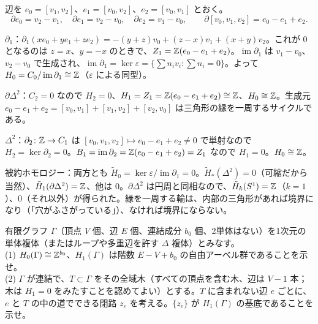 \begin{solution}
辺を $e_0=[v_1,v_2]$、$e_1=[v_0,v_2]$、$e_2=[v_0,v_1]$ とおく。
\[
\partial e_0=v_2-v_1,\quad\partial e_1=v_2-v_0,\quad\partial e_2=v_1-v_0,\qquad\partial[v_0,v_1,v_2]=e_0-e_1+e_2 .
\]

$\partial_1$：$\partial_1(xe_0+ye_1+ze_2)=-(y+z)v_0+(z-x)v_1+(x+y)v_2$。これが $0$ となるのは $z=x$、$y=-x$ のときで、$Z_1=\mathbb{Z}(e_0-e_1+e_2)$。$\operatorname{im}\partial_1$ は $v_1-v_0$、$v_2-v_0$ で生成され、$\operatorname{im}\partial_1=\ker\varepsilon=\{\sum n_iv_i:\sum n_i=0\}$。よって $H_0=C_0/\operatorname{im}\partial_1\cong\mathbb{Z}$（$\varepsilon$ による同型）。

$\partial\Delta^2$：$C_2=0$ なので $H_2=0$、$H_1=Z_1=\mathbb{Z}(e_0-e_1+e_2)\cong\mathbb{Z}$、$H_0\cong\mathbb{Z}$。生成元 $e_0-e_1+e_2=[v_0,v_1]+[v_1,v_2]+[v_2,v_0]$ は三角形の縁を一周するサイクルである。

$\Delta^2$：$\partial_2\colon\mathbb{Z}\to C_1$ は $[v_0,v_1,v_2]\mapsto e_0-e_1+e_2\ne0$ で単射なので $H_2=\ker\partial_2=0$。$B_1=\operatorname{im}\partial_2=\mathbb{Z}(e_0-e_1+e_2)=Z_1$ なので $H_1=0$。$H_0\cong\mathbb{Z}$。

被約ホモロジー：両方とも $\tilde H_0=\ker\varepsilon/\operatorname{im}\partial_1=0$。$\tilde H_*(\Delta^2)=0$（可縮だから当然）、$\tilde H_1(\partial\Delta^2)=\mathbb{Z}$、他は $0$。$\partial\Delta^2$ は円周と同相なので、$\tilde H_k(S^1)=\mathbb{Z}$（$k=1$）、$0$（それ以外）が得られた。縁を一周する輪は、内部の三角形があれば境界になり（「穴がふさがっている」）、なければ境界にならない。
\end{solution}

\begin{problem}[難易度 B]\label{ch04-prob-graph}
有限グラフ $\Gamma$（頂点 $V$ 個、辺 $E$ 個、連結成分 $b_0$ 個、2単体はない）を1次元の単体複体（またはループや多重辺を許す $\Delta$ 複体）とみなす。\\
(1) $H_0(\Gamma)\cong\mathbb{Z}^{b_0}$、$H_1(\Gamma)$ は階数 $E-V+b_0$ の自由アーベル群であることを示せ。\\
(2) $\Gamma$ が連結で、$T\subset\Gamma$ をその全域木（すべての頂点を含む木、辺は $V-1$ 本；木は $H_1=0$ をみたすことを認めてよい）とする。$T$ に含まれない辺 $e$ ごとに、$e$ と $T$ の中の道でできる閉路 $z_e$ を考える。$\{z_e\}$ が $H_1(\Gamma)$ の基底であることを示せ。
\end{problem}

